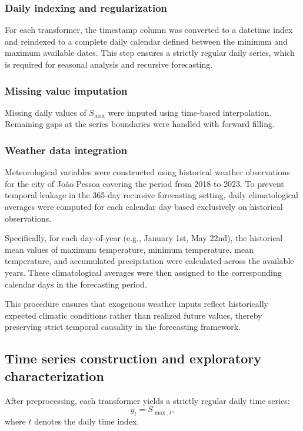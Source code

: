 \subsubsection{Daily indexing and regularization}
For each transformer, the timestamp column was converted to a datetime index and reindexed to a complete daily calendar defined between the minimum and maximum available dates. This step ensures a strictly regular daily series, which is required for seasonal analysis and recursive forecasting.

\subsubsection{Missing value imputation}
Missing daily values of $S_{\max}$ were imputed using time-based interpolation. Remaining gaps at the series boundaries were handled with forward filling.

\subsubsection{Weather data integration}

Meteorological variables were constructed using historical weather observations for the city of João Pessoa covering the period from 2018 to 2023. To prevent temporal leakage in the 365-day recursive forecasting setting, daily climatological averages were computed for each calendar day based exclusively on historical observations.

Specifically, for each day-of-year (e.g., January 1st, May 22nd), the historical mean values of maximum temperature, minimum temperature, mean temperature, and accumulated precipitation were calculated across the available years. These climatological averages were then assigned to the corresponding calendar days in the forecasting period.

This procedure ensures that exogenous weather inputs reflect historically expected climatic conditions rather than realized future values, thereby preserving strict temporal causality in the forecasting framework.


\subsection{Time series construction and exploratory characterization}
\label{subsec:ts_construction}

After preprocessing, each transformer yields a strictly regular daily time series:
\begin{equation}
y_t = S_{\max,t},
\end{equation}
where $t$ denotes the daily time index.

